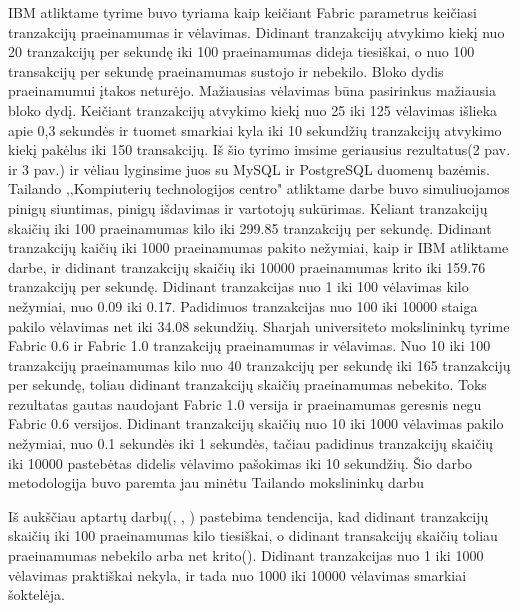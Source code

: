 \documentclass{VUMIFPSkursinis}
\begin{document}
			IBM atliktame tyrime \cite{IMBResearch} buvo tyriama kaip keičiant Fabric parametrus keičiasi tranzakcijų praeinamumas ir vėlavimas. Didinant tranzakcijų atvykimo kiekį nuo 20 tranzakcijų per sekundę iki 100 praeinamumas dideja tiesiškai, o nuo 100 transakcijų per sekundę praeinamumas sustojo ir nebekilo. Bloko dydis praeinamumui įtakos neturėjo. 
\newline
Mažiausias vėlavimas būna pasirinkus mažiausia bloko dydį. Keičiant tranzakcijų atvykimo kiekį nuo 25 iki 125 vėlavimas išlieka apie 0,3 sekundės ir tuomet smarkiai kyla iki 10 sekundžių tranzakcijų 
atvykimo kiekį pakėlus iki 150 transakcijų. 
\newline
Iš šio tyrimo imsime geriausius rezultatus(2 pav. ir 3 pav.) ir vėliau lyginsime juos su MySQL ir PostgreSQL duomenų bazėmis. 
			Tailando ,,Kompiuterių technologijos centro" atliktame darbe buvo simuliuojamos pinigų siuntimas, pinigų išdavimas ir vartotojų sukūrimas. Keliant tranzakcijų skaičių iki 100 praeinamumas kilo iki 299.85 tranzakcijų per sekundę. Didinant tranzakcijų kaičių iki 1000 praeinamumas pakito nežymiai, kaip ir IBM \cite{IMBResearch} atliktame darbe, ir didinant tranzakcijų skaičių iki 10000 praeinamumas krito iki 159.76 tranzakcijų per sekundę. 
Didinant tranzakcijas nuo 1 iki 100 vėlavimas kilo nežymiai, nuo 0.09 iki 0.17. Padidinuos tranzakcijas nuo 100 iki 10000 staiga pakilo vėlavimas net iki 34.08 sekundžių.
			Sharjah universiteto mokslininkų tyrime \cite{ShaFabPerf} Fabric 0.6 ir Fabric 1.0 tranzakcijų praeinamumas ir vėlavimas. Nuo 10 iki 100 tranzakcijų praeinamumas kilo nuo 40 tranzakcijų per sekundę iki 165 tranzakcijų per sekundę, toliau didinant tranzakcijų skaičių praeinamumas nebekito. Toks rezultatas gautas naudojant Fabric 1.0 versija ir praeinamumas geresnis negu Fabric 0.6 versijos. 
Didinant tranzakcijų skaičių nuo 10 iki 1000 vėlavimas pakilo nežymiai, nuo 0.1 sekundės iki 1 sekundės, tačiau padidinus tranzakcijų skaičių iki 10000 pastebėtas didelis vėlavimo pašokimas iki 10 sekundžių.
Šio darbo metodologija buvo paremta jau minėtu Tailando mokslininkų darbu \cite{ThailandPerf}

Iš aukščiau aptartų darbų(\cite{IMBResearch}, \cite{ThailandPerf}, \cite{ShaFabPerf}) pastebima tendencija, kad didinant tranzakcijų skaičių iki 100 praeinamumas kilo tiesiškai, o didinant transakcijų skaičių toliau praeinamumas nebekilo arba net krito(\cite{ThailandPerf}).
\newline
Didinant tranzakcijas nuo 1 iki 1000 vėlavimas praktiškai nekyla, ir tada nuo 1000 iki 10000 vėlavimas smarkiai šoktelėja. 
									
\end{document}
